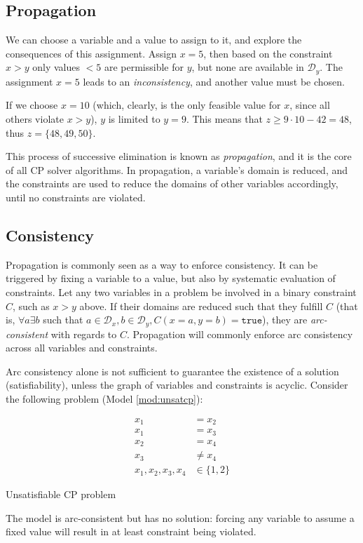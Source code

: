 \documentclass[13pt, letterpaper, oneside]{book}
\begin{document}
\subsection{Propagation}
We can choose a variable and a value to assign to it, and explore the
consequences of this assignment. Assign $x = 5$, then based on the constraint $x
> y$ only values $< 5$ are permissible for $y$, but none are available in
$\mathcal{D}_y$. The assignment $x = 5$ leads to an \textit{inconsistency}, and
another value must be chosen.
 
If we choose $x = 10$ (which, clearly, is the only feasible value for $x$, since all
others violate $x > y$), $y$ is limited to $y = 9$. This means that $z \geq 9 \cdot
10 - 42 = 48$, thus $z = \{48, 49, 50\}$.
 
This process of successive elimination is known as
\textit{propagation}, and it is the core of all CP solver algorithms. In
propagation, a variable's domain is reduced, and the constraints are used
to reduce the domains of other variables accordingly, until no constraints are
violated.

\subsection{Consistency}
Propagation is commonly seen as a way to enforce consistency. It can be
triggered by fixing a variable to a value, but also by systematic evaluation of
constraints. Let any two variables in a problem be involved in a binary
constraint $C$, such as $x > y$ above. If their domains are reduced such that
they fulfill $C$ (that is, $\forall a \exists b$ such that $a \in
\mathcal{D}_x, b \in \mathcal{D}_y, C(x = a, y = b) = \mathtt{true}$), they are
\textit{arc-consistent} with regards to $C$. Propagation will commonly enforce
arc consistency across all variables and constraints.
 
Arc consistency alone is not sufficient to guarantee the existence of a solution
(satisfiability), unless the graph of variables and constraints is acyclic.
Consider the following problem (Model \ref{mod:unsatcp}):
 
\begin{model}[h!]
\begin{align}
x_1 &= x_2\\
x_1 &= x_3\\
x_2 &= x_4\\
x_3 &\neq x_4\\
x_1, x_2, x_3, x_4 &\in \{1, 2\}
\end{align}
\caption{Unsatisfiable CP problem}
\label{mod:unsatcp}
\end{model}
The model is arc-consistent but has no solution: forcing any variable to assume
a fixed value will result in at least constraint being violated.
 
\end{document}
